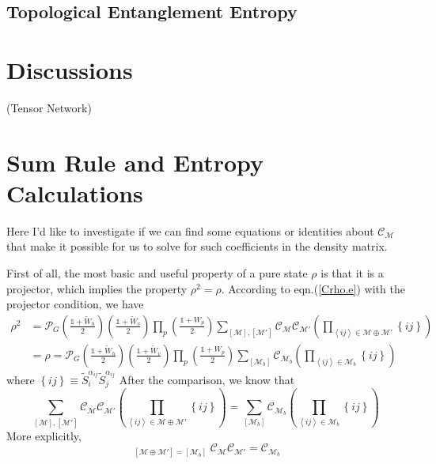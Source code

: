 \documentclass[12font]{article}
\theoremstyle{definition}
\numberwithin{equation}{section}
\newcommand{\anglelr}[1]{\left\langle #1 \right\rangle}
\newcommand{\lr}[1]{\left(  #1  \right)}
\newcommand{\lrg}[1]{\left\{  #1  \right\}}
\newcommand{\alert}[1]{{\color{red}#1}}
\begin{document}
\subsection{Topological Entanglement Entropy}
 
\section{Discussions}
\alert{(Tensor Network)}

\appendix
\section{Sum Rule and Entropy Calculations}
Here I'd like to investigate if we can find some equations or identities about $\mathcal{C}_{\mathcal{M}}$ that make it possible for us to solve for such coefficients in the density matrix.

First of all, the most basic and useful property of a pure state $\rho$ is that it is a projector, which implies the property $\rho^2 = \rho$. According to eqn.(\ref{Crho.e}) with the projector condition, we have
\begin{align*}
  \rho^2 &= \mathcal{P}_G\lr{\frac{\mathds{1}+\tilde{W}_h}{2}} \lr{\frac{\mathds{1}+\tilde{W}_v}{2}}\prod_{p} \lr{\frac{\mathds{1}+W_p}{2}} \sum_{[\mathcal{M}],[\mathcal{M}']}\mathcal{C}_{\mathcal{M}}\mathcal{C}_{\mathcal{M}'} \lr{\prod_{\anglelr{ij}\in\mathcal{M}\oplus\mathcal{M}'} \lrg{ij}} \\
  &= \rho = \mathcal{P}_G\lr{\frac{\mathds{1}+\tilde{W}_h}{2}} \lr{\frac{\mathds{1}+\tilde{W}_v}{2}}\prod_{p} \lr{\frac{\mathds{1}+W_p}{2}} \sum_{[\mathcal{M}_b]}\mathcal{C}_{\mathcal{M}_b} \lr{\prod_{\anglelr{ij}\in\mathcal{M}_b} \lrg{ij}}
\end{align*}
where $\lrg{ij} \equiv \tilde{S}^{\alpha_{ij}}_i\tilde{S}^{\alpha_{ij}}_j$ After the comparison, we know that 
\[
\sum_{[\mathcal{M}],[\mathcal{M}']}\mathcal{C}_{\mathcal{M}}\mathcal{C}_{\mathcal{M}'} \lr{\prod_{\anglelr{ij}\in\mathcal{M}\oplus\mathcal{M}'} \lrg{ij}}
=
\sum_{[\mathcal{M}_b]}\mathcal{C}_{\mathcal{M}_b} \lr{\prod_{\anglelr{ij}\in\mathcal{M}_b} \lrg{ij}}
\]
More explicitly, 
\begin{equation}\label{pre-identity.e}
\mathop{\sum_{[\mathcal{M}],[\mathcal{M}']}}_{[\mathcal{M}\oplus\mathcal{M}'] = [\mathcal{M}_b]} \mathcal{C}_{\mathcal{M}}\mathcal{C}_{\mathcal{M}'} = \mathcal{C}_{\mathcal{M}_b}
\end{equation}
\end{document}

